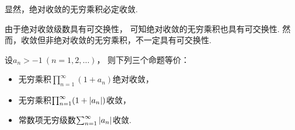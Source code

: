 显然，绝对收敛的无穷乘积必定收敛.

由于绝对收敛级数具有可交换性，
可知绝对收敛的无穷乘积也具有可交换性.
然而，收敛但非绝对收敛的无穷乘积，不一定具有可交换性.

\begin{theorem}
设\(a_n>-1\ (n=1,2,\dotsc)\)，
则下列三个命题等价：\begin{itemize}
	\item 无穷乘积\(\prod_{n=1}^\infty (1+a_n)\)绝对收敛，
	\item 无穷乘积\(\prod_{n=1}^\infty (1+\abs{a_n})\)收敛，
	\item 常数项无穷级数\(\sum_{n=1}^\infty \abs{a_n}\)收敛.
\end{itemize}
\end{theorem}

